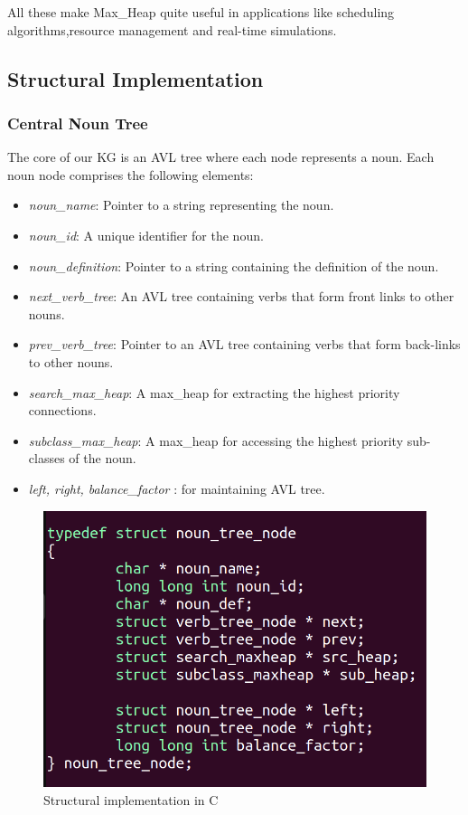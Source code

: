 \documentclass[conference]{IEEEtran}
\begin{document}
All these make Max\_Heap quite useful in applications like scheduling algorithms,resource management 
and real-time simulations.


\subsection{Structural Implementation}

\subsubsection{\textbf{Central Noun Tree}}
The core of our KG is an AVL tree where each node represents a noun. Each noun node comprises the following elements:
\begin{itemize}

    \item \textit{noun\_name}: Pointer to a string representing the noun.
    \item \textit{noun\_id}: A unique identifier for the noun.
    \item \textit{noun\_definition}: Pointer to a string containing the definition of the noun.
    \item \textit{next\_verb\_tree}: An AVL tree containing verbs that form front links to other nouns.
    \item \textit{prev\_verb\_tree}: Pointer to an AVL tree containing verbs that form back-links to other nouns.
    \item \textit{search\_max\_heap}: A max\_heap for extracting the highest priority connections.
    \item \textit{subclass\_max\_heap}: A max\_heap for accessing the highest priority sub-classes of the noun.
    \item \textit{left, right, balance\_factor} : for maintaining AVL tree. 
    
\end{itemize}

\begin{figure}[htbp]
\centering
\includegraphics[width=0.8\linewidth]{c1.png} %
\caption{Structural implementation in C}
\label{fig}
\end{figure}
\end{document}
